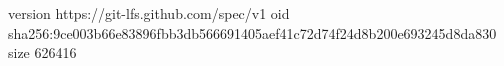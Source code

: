 version https://git-lfs.github.com/spec/v1
oid sha256:9ce003b66e83896fbb3db566691405aef41c72d74f24d8b200e693245d8da830
size 626416
